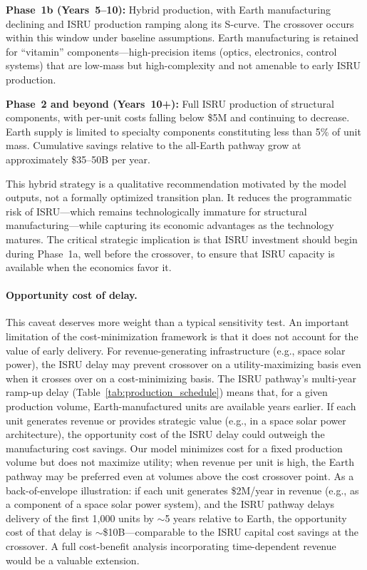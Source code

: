 \documentclass[preprint,12pt]{elsarticle}
\begin{document}
\textbf{Phase~1b (Years~5--10):} Hybrid production, with Earth manufacturing declining and ISRU production ramping along its S-curve. The crossover occurs within this window under baseline assumptions. Earth manufacturing is retained for ``vitamin'' components---high-precision items (optics, electronics, control systems) that are low-mass but high-complexity and not amenable to early ISRU production.

\textbf{Phase~2 and beyond (Years~10+):} Full ISRU production of structural components, with per-unit costs falling below \$5M and continuing to decrease. Earth supply is limited to specialty components constituting less than 5\% of unit mass. Cumulative savings relative to the all-Earth pathway grow at approximately \$35--50B per year.

This hybrid strategy is a qualitative recommendation motivated by the model outputs, not a formally optimized transition plan. It reduces the programmatic risk of ISRU---which remains technologically immature for structural manufacturing---while capturing its economic advantages as the technology matures. The critical strategic implication is that ISRU investment should begin during Phase~1a, well before the crossover, to ensure that ISRU capacity is available when the economics favor it.

\paragraph{Opportunity cost of delay.} This caveat deserves more weight than a typical sensitivity test. An important limitation of the cost-minimization framework is that it does not account for the value of early delivery. For revenue-generating infrastructure (e.g., space solar power), the ISRU delay may prevent crossover on a utility-maximizing basis even when it crosses over on a cost-minimizing basis. The ISRU pathway's multi-year ramp-up delay (Table~\ref{tab:production_schedule}) means that, for a given production volume, Earth-manufactured units are available years earlier. If each unit generates revenue or provides strategic value (e.g., in a space solar power architecture), the opportunity cost of the ISRU delay could outweigh the manufacturing cost savings. Our model minimizes cost for a fixed production volume but does not maximize utility; when revenue per unit is high, the Earth pathway may be preferred even at volumes above the cost crossover point. As a back-of-envelope illustration: if each unit generates \$2M/year in revenue (e.g., as a component of a space solar power system), and the ISRU pathway delays delivery of the first 1{,}000 units by $\sim$5 years relative to Earth, the opportunity cost of that delay is $\sim$\$10B---comparable to the ISRU capital cost savings at the crossover. A full cost-benefit analysis incorporating time-dependent revenue would be a valuable extension.
\end{document}
